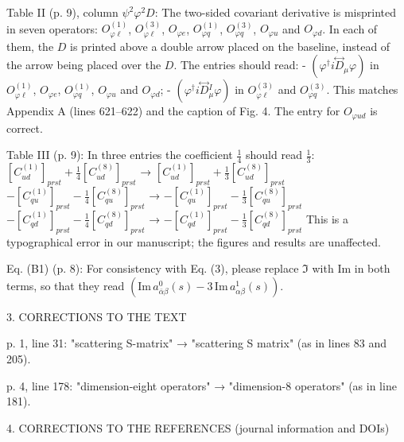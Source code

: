 Table II (p. 9), column $\psi^2\varphi^2 D$:
The two-sided covariant derivative is misprinted in seven operators:
$O^{(1)}_{\varphi\ell}$, $O^{(3)}_{\varphi\ell}$, $O_{\varphi e}$, $O^{(1)}_{\varphi q}$, $O^{(3)}_{\varphi q}$, $O_{\varphi u}$ and $O_{\varphi d}$.
In each of them, the $D$ is printed above a double arrow placed on the
baseline, instead of the arrow being placed over the $D$. The entries
should read:
  - $(\varphi^\dagger i\overset{\leftrightarrow}{D}{}_\mu\varphi)$ in $O^{(1)}_{\varphi\ell}$, $O_{\varphi e}$, $O^{(1)}_{\varphi q}$, $O_{\varphi u}$ and $O_{\varphi d}$;
  - $(\varphi^\dagger i\overset{\leftrightarrow}{D}{}_\mu^I \varphi)$ in $O^{(3)}_{\varphi\ell}$ and $O^{(3)}_{\varphi q}$.
This matches Appendix A (lines 621–622) and the caption of Fig. 4. The
entry for $O_{\varphi ud}$ is correct.

Table III (p. 9):
In three entries the coefficient $\tfrac{1}{4}$ should read $\tfrac{1}{3}$:
  $[C_{ud}^{(1)}]_{prst} + \tfrac{1}{4}[C_{ud}^{(8)}]_{prst}$  →  $[C_{ud}^{(1)}]_{prst} + \tfrac{1}{3}[C_{ud}^{(8)}]_{prst}$
  $-[C_{qu}^{(1)}]_{prst} - \tfrac{1}{4}[C_{qu}^{(8)}]_{prst}$  →  $-[C_{qu}^{(1)}]_{prst} - \tfrac{1}{3}[C_{qu}^{(8)}]_{prst}$
  $-[C_{qd}^{(1)}]_{prst} - \tfrac{1}{4}[C_{qd}^{(8)}]_{prst}$  →  $-[C_{qd}^{(1)}]_{prst} - \tfrac{1}{3}[C_{qd}^{(8)}]_{prst}$
This is a typographical error in our manuscript; the figures and results
are unaffected.

Eq. (B1) (p. 8):
For consistency with Eq. (3), please replace $\Im$ with $\text{Im}$ in
both terms, so that they read
$\left(\text{Im}\,a^0_{\bar\alpha\beta}(s) - 3\,\text{Im}\,a^1_{\alpha\beta}(s)\right)$.


3. CORRECTIONS TO THE TEXT

p. 1, line 31: "scattering S-matrix" → "scattering S matrix" (as in
lines 83 and 205).

p. 4, line 178: "dimension-eight operators" → "dimension-8 operators" (as
in line 181).


4. CORRECTIONS TO THE REFERENCES (journal information and DOIs)

